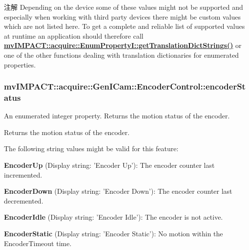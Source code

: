\begin{DoxyNote}{注解}
Depending on the device some of these values might not be supported and especially when working with third party devices there might be custom values which are not listed here. To get a complete and reliable list of supported values at runtime an application should therefore call {\bfseries \hyperlink{classmv_i_m_p_a_c_t_1_1acquire_1_1_enum_property_i_a0ba6ccbf5ee69784d5d0b537924d26b6}{mv\+I\+M\+P\+A\+C\+T\+::acquire\+::\+Enum\+Property\+I\+::get\+Translation\+Dict\+Strings()}} or one of the other functions dealing with translation dictionaries for enumerated properties. 
\end{DoxyNote}
\hypertarget{classmv_i_m_p_a_c_t_1_1acquire_1_1_gen_i_cam_1_1_encoder_control_a8708ad7edd51797a09c2b4202faac011}{
\subsubsection[{encoder\+Status}]{ mv\+I\+M\+P\+A\+C\+T\+::acquire\+::\+Gen\+I\+Cam\+::\+Encoder\+Control\+::encoder\+Status}}\label{classmv_i_m_p_a_c_t_1_1acquire_1_1_gen_i_cam_1_1_encoder_control_a8708ad7edd51797a09c2b4202faac011}


An enumerated integer property. Returns the motion status of the encoder. 

Returns the motion status of the encoder.

The following string values might be valid for this feature\+:
\begin{DoxyItemize}
\item {\bfseries Encoder\+Up} (Display string\+: 'Encoder Up')\+: The encoder counter last incremented.
\item {\bfseries Encoder\+Down} (Display string\+: 'Encoder Down')\+: The encoder counter last decremented.
\item {\bfseries Encoder\+Idle} (Display string\+: 'Encoder Idle')\+: The encoder is not active.
\item {\bfseries Encoder\+Static} (Display string\+: 'Encoder Static')\+: No motion within the Encoder\+Timeout time.
\end{DoxyItemize}

